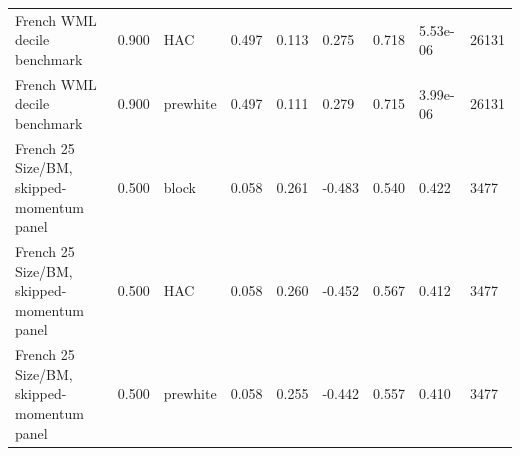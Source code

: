 \begin{table}[!htbp]
{\begin{tabular}{lllllllll}
French WML decile benchmark & 0.900 & HAC & 0.497 & 0.113 & 0.275 & 0.718 & 5.53e-06 & 26131 \\
French WML decile benchmark & 0.900 & prewhite & 0.497 & 0.111 & 0.279 & 0.715 & 3.99e-06 & 26131 \\
French 25 Size/BM, skipped-momentum panel & 0.500 & block & 0.058 & 0.261 & -0.483 & 0.540 & 0.422 & 3477 \\
French 25 Size/BM, skipped-momentum panel & 0.500 & HAC & 0.058 & 0.260 & -0.452 & 0.567 & 0.412 & 3477 \\
French 25 Size/BM, skipped-momentum panel & 0.500 & prewhite & 0.058 & 0.255 & -0.442 & 0.557 & 0.410 & 3477 \\
\bottomrule
\end{tabular}%
}
\end{table}


\clearpage

